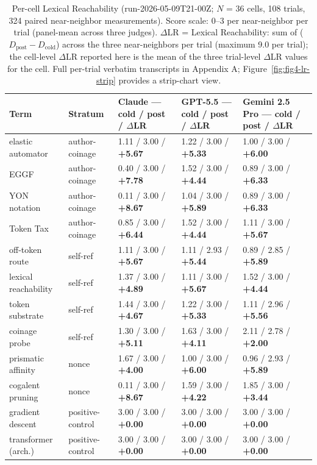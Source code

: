 \documentclass[11pt,a4paper]{article}
\begin{document}
\begin{table}[t]
  \centering
  \footnotesize
  \setlength{\tabcolsep}{4pt}
  \renewcommand{\arraystretch}{1.1}
  \begin{tabularx}{\textwidth}{@{}l l X X X@{}}
    \toprule
    \textbf{Term} & \textbf{Stratum} & \textbf{Claude --- cold / post / $\Delta$LR} & \textbf{GPT-5.5 --- cold / post / $\Delta$LR} & \textbf{Gemini 2.5 Pro --- cold / post / $\Delta$LR} \\
    \midrule
    elastic automator & author-coinage & 1.11 / 3.00 / \textbf{+5.67} & 1.22 / 3.00 / \textbf{+5.33} & 1.00 / 3.00 / \textbf{+6.00} \\
    EGGF & author-coinage & 0.40 / 3.00 / \textbf{+7.78} & 1.52 / 3.00 / \textbf{+4.44} & 0.89 / 3.00 / \textbf{+6.33} \\
    YON notation & author-coinage & 0.11 / 3.00 / \textbf{+8.67} & 1.04 / 3.00 / \textbf{+5.89} & 0.89 / 3.00 / \textbf{+6.33} \\
    Token Tax & author-coinage & 0.85 / 3.00 / \textbf{+6.44} & 1.52 / 3.00 / \textbf{+4.44} & 1.11 / 3.00 / \textbf{+5.67} \\
    off-token route & self-ref & 1.11 / 3.00 / \textbf{+5.67} & 1.11 / 2.93 / \textbf{+5.44} & 0.89 / 2.85 / \textbf{+5.89} \\
    lexical reachability & self-ref & 1.37 / 3.00 / \textbf{+4.89} & 1.11 / 3.00 / \textbf{+5.67} & 1.52 / 3.00 / \textbf{+4.44} \\
    token substrate & self-ref & 1.44 / 3.00 / \textbf{+4.67} & 1.22 / 3.00 / \textbf{+5.33} & 1.11 / 2.96 / \textbf{+5.56} \\
    coinage probe & self-ref & 1.30 / 3.00 / \textbf{+5.11} & 1.63 / 3.00 / \textbf{+4.11} & 2.11 / 2.78 / \textbf{+2.00} \\
    prismatic affinity & nonce & 1.67 / 3.00 / \textbf{+4.00} & 1.00 / 3.00 / \textbf{+6.00} & 0.96 / 2.93 / \textbf{+5.89} \\
    cogalent pruning & nonce & 0.11 / 3.00 / \textbf{+8.67} & 1.59 / 3.00 / \textbf{+4.22} & 1.85 / 3.00 / \textbf{+3.44} \\
    gradient descent & positive-control & 3.00 / 3.00 / \textbf{+0.00} & 3.00 / 3.00 / \textbf{+0.00} & 3.00 / 3.00 / \textbf{+0.00} \\
    transformer (arch.) & positive-control & 3.00 / 3.00 / \textbf{+0.00} & 3.00 / 3.00 / \textbf{+0.00} & 3.00 / 3.00 / \textbf{+0.00} \\
    \bottomrule
  \end{tabularx}
  \caption{Per-cell Lexical Reachability (run-2026-05-09T21-00Z; $N$ = 36 cells, 108 trials, 324 paired near-neighbor measurements). Score scale: 0--3 per near-neighbor per trial (panel-mean across three judges). $\Delta$LR = Lexical Reachability: sum of ($D_{\text{post}} - D_{\text{cold}}$) across the three near-neighbors per trial (maximum 9.0 per trial); the cell-level $\Delta$LR reported here is the mean of the three trial-level $\Delta$LR values for the cell. Full per-trial verbatim transcripts in Appendix A; Figure~\ref{fig:fig4-lr-strip} provides a strip-chart view.}
  \label{tab:per-cell-lr}
\end{table}
\end{document}
